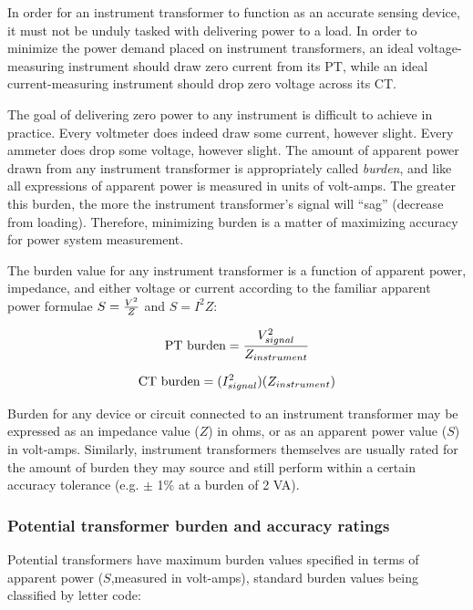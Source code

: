 In order for an instrument transformer to function as an accurate sensing device, it must not be unduly tasked with delivering power to a load.  In order to minimize the power demand placed on instrument transformers, an ideal voltage-measuring instrument should draw zero current from its PT, while an ideal current-measuring instrument should drop zero voltage across its CT.

The goal of delivering zero power to any instrument is difficult to achieve in practice.  Every voltmeter does indeed draw some current, however slight.  Every ammeter does drop some voltage, however slight.  The amount of apparent power drawn from any instrument transformer is appropriately called \textit{burden}, and like all expressions of apparent power is measured in units of volt-amps.  The greater this burden, the more the instrument transformer's signal will ``sag'' (decrease from loading).  Therefore, minimizing burden is a matter of maximizing accuracy for power system measurement.  

The burden value for any instrument transformer is a function of apparent power, impedance, and either voltage or current according to the familiar apparent power formulae $S = {V^2 \over Z}$ and $S = I^2 Z$:

$$\hbox{PT burden} = {V^2_{signal} \over Z_{instrument}}$$

$$\hbox{CT burden} = (I^2_{signal}) (Z_{instrument})$$

Burden for any device or circuit connected to an instrument transformer may be expressed as an impedance value ($Z$) in ohms, or as an apparent power value ($S$) in volt-amps.  Similarly, instrument transformers themselves are usually rated for the amount of burden they may source and still perform within a certain accuracy tolerance (e.g. $\pm$ 1\% at a burden of 2 VA).








\filbreak
\subsubsection{Potential transformer burden and accuracy ratings}

Potential transformers have maximum burden values specified in terms of apparent power ($S$,measured in volt-amps), standard burden values being classified by letter code:

